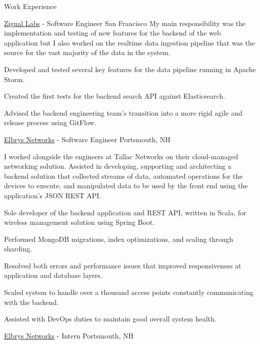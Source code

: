 \documentclass[UKenglish]{resume} %
\begin{document}
\begin{rSection}{Work Experience}
    \begin{rSubsection}
        {\href{https://www.zignallabs.com}{Zignal Labs}}
        {  -  }
        {Software Engineer}
        {San Francisco}
        My main responsibility was the implementation and testing of new features for the backend of the web application but I also worked on the realtime data ingestion pipeline that was the source for the vast majority of the data in the system. \par
        \item Developed and tested several key features for the data pipeline running in Apache Storm.
        \item Created the first tests for the backend search API against Elasticsearch.
        \item Advised the backend engineering team's transition into a more rigid agile and release process using GitFlow.
    \end{rSubsection}


    \begin{rSubsection}
        {\href{}{Elbrys Networks}}
        {  -  }
        {Software Engineer}
        {Portsmouth, NH}

        I worked alongside the engineers at Tallac Networks on their cloud-managed networking solution. Assisted in developing, supporting and architecting a backend solution that collected streams of data, automated operations for the devices to execute, and manipulated data to be used by the front end using the application's JSON REST API.\par
        \item Sole developer of the backend application and REST API, written in Scala, for wireless management solution using Spring Boot.
        \item Performed MongoDB migrations, index optimizations, and scaling through sharding.
        \item Resolved both errors and performance issues that improved responsiveness at application and database layers.
        \item Scaled system to handle over a thousand access points constantly communicating with the backend.
        \item Assisted with DevOps duties to maintain good overall system health.

    \end{rSubsection}

    \begin{rSubsection}
        {\href{}{Elbrys Networks}}
        {  -  }
        {Intern}
        {Portsmouth, NH}


\end{rSubsection}
\end{rSection}
\end{document}

